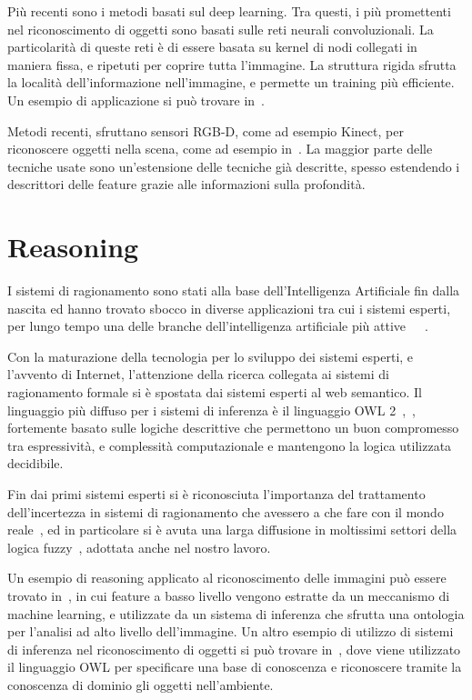 Più recenti sono i metodi basati sul deep learning. Tra questi, i più promettenti nel riconoscimento di oggetti sono basati sulle reti neurali convoluzionali. La particolarità di queste reti è di essere basata su kernel di nodi collegati in maniera fissa, e ripetuti per coprire tutta l'immagine. La struttura rigida sfrutta la località dell'informazione nell'immagine, e permette un training più efficiente.
Un esempio di applicazione si può trovare in~\cite{NIPS2012_4824}.

Metodi recenti, sfruttano sensori RGB-D, come ad esempio Kinect, per riconoscere oggetti nella scena, come ad esempio in~\cite{lai2012detection}. La maggior parte delle tecniche usate sono un'estensione delle tecniche già descritte, spesso estendendo i descrittori delle feature grazie alle informazioni sulla profondità.

\section{Reasoning}

I sistemi di ragionamento sono stati alla base dell'Intelligenza Artificiale fin dalla nascita ed hanno trovato sbocco in diverse applicazioni tra cui i sistemi esperti, per lungo tempo una delle branche dell'intelligenza artificiale più attive~\cite{buchanan1984rule}~\cite{davis1977production}~\cite{joseph1994riley}.

Con la maturazione della tecnologia per lo sviluppo dei sistemi esperti, e l'avvento di Internet, l'attenzione della ricerca collegata ai sistemi di ragionamento formale si è spostata dai sistemi esperti al web semantico.
Il linguaggio più diffuso per i sistemi di inferenza è il linguaggio OWL 2~\cite{owl2-overview},~\cite{owl2-primer}, fortemente basato sulle logiche descrittive che permettono un buon compromesso tra espressività, e complessità computazionale e mantengono la logica utilizzata decidibile.

Fin dai primi sistemi esperti si è riconosciuta l'importanza del trattamento dell'incertezza in sistemi di ragionamento che avessero a che fare con il mondo reale~\cite{davis1977production}, ed in particolare si è avuta una larga diffusione in moltissimi settori della logica fuzzy~\cite{Zadeh1965338}, adottata anche nel nostro lavoro.

Un esempio di reasoning applicato al riconoscimento delle immagini può essere trovato in~\cite{DBLP:journals/ivc/MaillotT08}, in cui feature a basso livello vengono estratte da un meccanismo di machine learning, e utilizzate da un sistema di inferenza che sfrutta una ontologia per l'analisi ad alto livello dell'immagine. Un altro esempio di utilizzo di sistemi di inferenza nel riconoscimento di oggetti si può trovare in~\cite{DBLP:journals/corr/abs-1301-4991}, dove viene utilizzato il linguaggio OWL per specificare una base di conoscenza e riconoscere tramite la conoscenza di dominio gli oggetti nell'ambiente.

